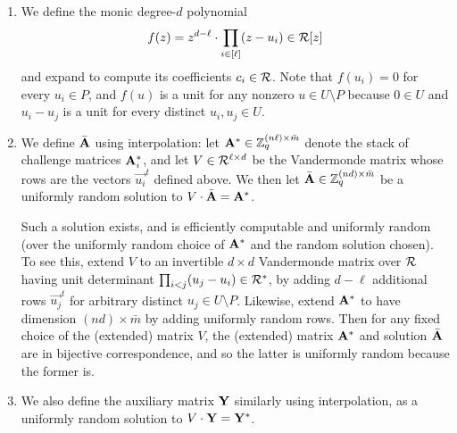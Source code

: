 \begin{enumerate}[itemsep=0pt]
\item We define the monic degree-$d$ polynomial \[ f(z) = z^{d-\ell}
  \cdot \prod_{i \in [\ell]} (z-u_{i}) \in \mathcal{R}[z] \] and expand to
  compute its coefficients $c_{i} \in \mathcal{R}$.  Note that $f(u_{i}) =
  0$ for every $u_{i} \in P$, and $f(u)$ is a unit for any nonzero $u
  \in U \setminus P$ because $0 \in U$ and $u_{i}-u_{j}$ is a unit for
  every distinct $u_{i},u_{j} \in U$.
\item We define $\bar{\mathbf{A}}$ using interpolation: let $\mathbf{A}^{*} \in
  \mathbb{Z}_q^{(n \ell) \times \bar{m}}$ denote the stack of challenge
  matrices $\mathbf{A}^{*}_{i}$, and let $V \in \mathcal{R}^{\ell \times d}$ be
  the Vandermonde matrix whose rows are the vectors $\vec{u_{i}}^{t}$
  defined above.  We then let $\bar{\mathbf{A}} \in \mathbb{Z}_q^{(nd) \times
    \bar{m}}$ be a uniformly random solution to $V \cdot \bar{\mathbf{A}} =
  \mathbf{A}^{*}$.

  Such a solution exists, and is efficiently computable and uniformly
  random (over the uniformly random choice of $\mathbf{A}^{*}$ and the
  random solution chosen).  To see this, extend $V$ to an invertible
  $d \times d$ Vandermonde matrix over $\mathcal{R}$ having unit determinant
  $\prod_{i < j} (u_{j}-u_{i}) \in \mathcal{R}^{*}$, by adding $d-\ell$
  additional rows $\vec{u_{j}}^{t}$ for arbitrary distinct $u_{j} \in
  U \setminus P$.  Likewise, extend $\mathbf{A}^{*}$ to have dimension $(n
  d) \times \bar{m}$ by adding uniformly random rows.  Then for any
  fixed choice of the (extended) matrix $V$, the (extended) matrix
  $\mathbf{A}^{*}$ and solution $\bar{\mathbf{A}}$ are in bijective
  correspondence, and so the latter is uniformly random because the
  former is.
\item We also define the auxiliary matrix $\mathbf{Y}$ similarly using
  interpolation, as a uniformly random solution to $V \cdot \mathbf{Y} =
  \mathbf{Y}^{*}$.
\end{enumerate}


